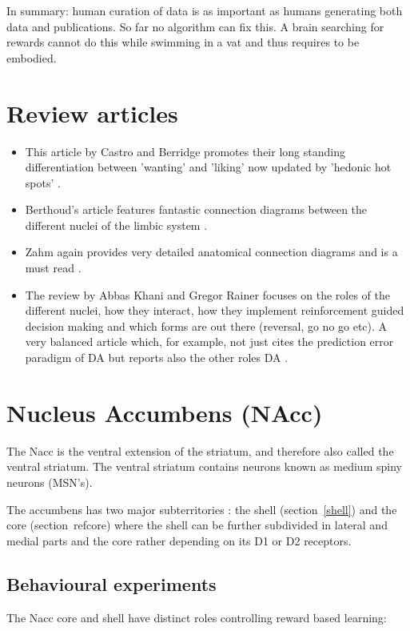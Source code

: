 \documentclass[12pt,a4paper]{article}
\begin{document}
In summary: human curation of data is as important as humans
generating both data and publications. So far no algorithm can
fix this. A brain searching for rewards cannot do this while swimming
in a vat and thus requires to be embodied.





\section{Review articles}
\begin{itemize}
\item This article by Castro and Berridge promotes their long standing
  differentiation between 'wanting' and 'liking' \citep{Berridge2009}
  now updated by 'hedonic hot spots' \citep{Castro2015}.
\item Berthoud's article features fantastic connection diagrams
  between the different nuclei of the limbic system
  \citep{Berthoud04}.
\item Zahm again provides very detailed anatomical connection diagrams
  and is a must read \citep{Zahm00}.
\item The review by Abbas Khani and Gregor Rainer focuses on the
  roles of the different nuclei, how they interact, how they implement
  reinforcement guided decision making and which forms are out there
  (reversal, go no go etc). A very balanced article which, for
  example, not just cites the prediction error paradigm of DA but
  reports also the other roles DA \citep{Khani2016}.
\end{itemize}










\section{Nucleus Accumbens (NAcc)\label{nacc}}
The Nacc is the ventral extension of the striatum, and therefore also
called the ventral striatum.  The ventral striatum contains neurons
known as medium spiny neurons (MSN's).

The accumbens has two major subterritories \citep{heimer91}: the shell
(section~\ref{shell}) and the core (section~ref{core})
where the shell can be further subdivided
\citep{Usuda1998} in lateral and medial parts and the core rather
depending on its D1 or D2 receptors.


\subsection{Behavioural experiments}
The Nacc core and shell have distinct roles controlling reward based learning:
\end{document}
